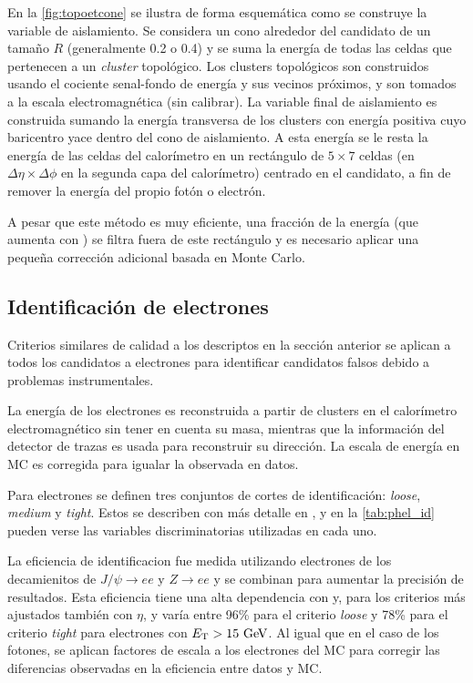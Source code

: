 En la \cref{fig:topoetcone} se ilustra de forma esquemática como se construye
la variable de aislamiento. Se considera un cono alrededor del candidato
de un tamaño $R$ (generalmente 0.2 o 0.4) y se suma la energía de todas las
celdas que pertenecen a un \emph{cluster} topológico. Los clusters topológicos son
construidos usando el cociente senal-fondo de energía y sus vecinos próximos,
y son tomados a la escala electromagnética (sin calibrar). La variable final de
aislamiento es construida sumando la energía transversa de los clusters con
energía positiva cuyo baricentro yace dentro del cono de aislamiento. A esta
energía se le resta la energía de las celdas del calorímetro en un rectángulo de
$5\times 7$ celdas (en $\Delta\eta \times \Delta\phi$ en la segunda capa del
calorímetro) centrado en el candidato, a fin de remover la energía del propio
fotón o electrón.

A pesar que este método es muy eficiente, una fracción de la energía (que aumenta con {\pt}) se filtra fuera de
este rectángulo y es necesario aplicar una peque\~na corrección adicional
basada en Monte Carlo.


\subsection{Identificación de electrones}
\label{sec:elec_obj}

Criterios similares de calidad a los descriptos en la sección anterior
se aplican a todos los candidatos a electrones para identificar candidatos
falsos debido a problemas instrumentales.

La energía de los electrones es reconstruida a partir de clusters en el calorímetro
electromagnético sin tener en cuenta su masa, mientras que la información del
detector de trazas es usada para reconstruir su dirección. La escala de energía
en MC es corregida para igualar la observada en datos.

Para electrones se definen tres conjuntos de cortes de identificación: \emph{loose}, \emph{medium} y
\emph{tight}. Estos se describen con más detalle en \cite{ATL-PHYS-PUB-2011-007}, y
en la \cref{tab:phel_id} pueden verse las variables discriminatorias utilizadas
en cada uno.

La eficiencia de identificacion fue medida utilizando electrones de los
decamienitos de $J/\psi\to ee$ y $Z\to ee$ y se combinan para aumentar la
precisión de resultados. Esta eficiencia tiene una alta dependencia con {\et} y, para
los criterios más ajustados también con $\eta$, y varía entre 96\% para el criterio
\emph{loose} y 78\% para el criterio \emph{tight} para electrones con $\et>15\gev$.
Al igual que en el caso de los fotones, se aplican factores de escala
a los electrones del MC para corregir las diferencias observadas en la
eficiencia entre datos y MC.


